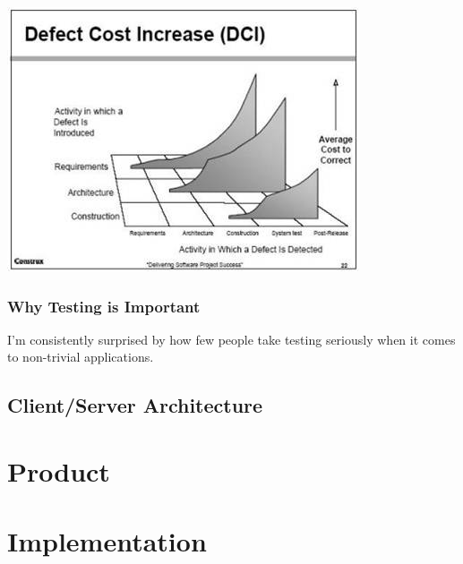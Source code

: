 \documentclass[11pt]{article}
\newenvironment{Figure}
  {\par\medskip\noindent\minipage{\linewidth}}
  {\endminipage\par\medskip}
\begin{document}
\begin{multicols}{2}
\begin{Figure}
	\includegraphics[width=\linewidth]{defectcost.jpg} 
\end{Figure}

\subsubsection{Why Testing is Important}
I'm consistently surprised by how few people take testing seriously when it comes to non-trivial applications. 


\subsection{Client/Server Architecture}



\section{Product}


\section{Implementation}



\end{multicols}
\end{document}
